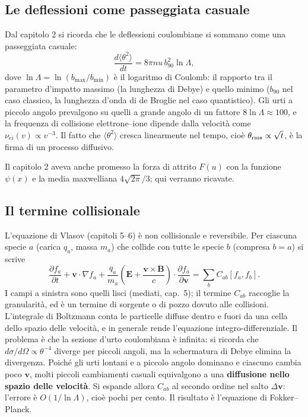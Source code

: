 \subsection{Le deflessioni come passeggiata casuale}
Dal capitolo 2 si ricorda che le deflessioni coulombiane si sommano come una passeggiata casuale:
\begin{equation}
\frac{d\langle\theta^2\rangle}{dt}=8\pi n u\, b_{90}^2\ln\Lambda ,
\end{equation}
dove $\ln\Lambda=\ln(b_{\max}/b_{\min})$ è il logaritmo di Coulomb: il rapporto tra il parametro d'impatto massimo (la lunghezza di Debye) e quello minimo ($b_{90}$ nel caso classico, la lunghezza d'onda di de Broglie nel caso quantistico). Gli urti a piccolo angolo prevalgono su quelli a grande angolo di un fattore $8\ln\Lambda\approx100$, e la frequenza di collisione elettrone--ione dipende dalla velocità come $\nu_{ei}(v)\propto v^{-3}$.
Il fatto che $\langle\theta^2\rangle$ cresca linearmente nel tempo, cioè $\theta_{\rm rms}\propto\sqrt{t}$, è la firma di un processo diffusivo.

Il capitolo 2 aveva anche promesso la forza di attrito $F(u)$ con la funzione $\psi(x)$ e la media maxwelliana $4\sqrt{2\pi}/3$; qui verranno ricavate.

\subsection{Il termine collisionale}
L'equazione di Vlasov (capitoli 5--6) è non collisionale e reversibile. Per ciascuna specie $a$ (carica $q_a$, massa $m_a$) che collide con tutte le specie $b$ (compresa $b=a$) si scrive
\begin{equation}
\frac{\partial f_a}{\partial t}+\mathbf{v}\cdot\nabla f_a+\frac{q_a}{m_a}\left(\mathbf{E}+\frac{\mathbf{v}\times\mathbf{B}}{c}\right)\cdot\frac{\partial f_a}{\partial\mathbf{v}}=\sum_b C_{ab}[f_a,f_b].
\end{equation}
I campi a sinistra sono quelli lisci (mediati, cap.~5); il termine $C_{ab}$ raccoglie la granularità, ed è un termine di sorgente o di pozzo dovuto alle collisioni. L'integrale di Boltzmann conta le particelle diffuse dentro e fuori da una cella dello spazio delle velocità, e in generale rende l'equazione integro-differenziale.
Il problema è che la sezione d'urto coulombiana è infinita: si ricorda che $d\sigma/d\Omega\propto\theta^{-4}$ diverge per piccoli angoli, ma la schermatura di Debye elimina la divergenza. Poiché gli urti lontani e a piccolo angolo dominano e ciascuno cambia poco $\mathbf{v}$, molti piccoli cambiamenti casuali equivalgono a una \textbf{diffusione nello spazio delle velocità}. Si espande allora $C_{ab}$ al secondo ordine nel salto $\Delta\mathbf{v}$: l'errore è $O(1/\ln\Lambda)$, cioè pochi per cento. Il risultato è l'equazione di Fokker--Planck.

